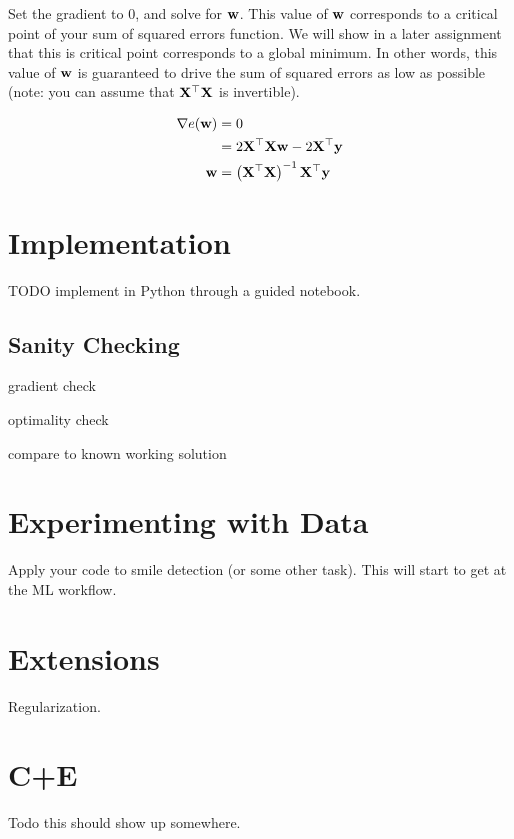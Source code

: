 \documentclass[assignment02_Solutions]{subfiles}
\begin{document}
\begin{exercise}[60 minutes]
\item Set the gradient to 0, and solve for $\mathbf{w}$.  This value of $\mathbf{w}$ corresponds to a critical point of your sum of squared errors function.  We will show in a later assignment that this is critical point corresponds to a global minimum.  In other words, this value of $\mathbf{w}$ is guaranteed to drive the sum of squared errors as low as possible (note: you can assume that $\mathbf{X}^\top \mathbf{X}$ is invertible).

\begin{boxedsolution}
\begin{align}
\nabla e(\mathbf{w})  &= 0 \\
&= 2 \mathbf{X}^\top \mathbf{X} \mathbf{w} - 2 \mathbf{X}^\top \mathbf{y}\\
\mathbf{w} &= \left ( \mathbf{X}^\top \mathbf{X} \right )^{-1} \mathbf{X}^\top \mathbf{y}
\end{align}
\end{boxedsolution}
\fi

\ees
\end{exercise}
%

\section{Implementation}

TODO implement in Python through a guided notebook.

\subsection{Sanity Checking}
\be
\item gradient check
\item optimality check
\item compare to known working solution
\ee

\section{Experimenting with Data}

Apply your code to smile detection (or some other task).  This will start to get at the ML workflow.


\section{Extensions}
Regularization.

\section{C+E}
Todo this should show up somewhere.
\end{document}
